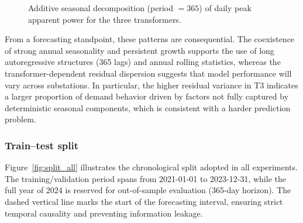 \begin{figure}[!h]
\centering
\begin{subfigure}[t]{\columnwidth}
    \centering
    
\end{subfigure}\par\vspace{0.15cm}
\begin{subfigure}[t]{\columnwidth}
    \centering
    
\end{subfigure}\par\vspace{0.15cm}
\begin{subfigure}[t]{\columnwidth}
    \centering
    
\end{subfigure}
\caption{Additive seasonal decomposition (period $=365$) of daily peak apparent power for the three transformers.}
\label{fig:decomp_all}
\end{figure}

From a forecasting standpoint, these patterns are consequential. The coexistence of strong annual seasonality and persistent growth supports the use of long autoregressive structures (365 lags) and annual rolling statistics, whereas the transformer-dependent residual dispersion suggests that model performance will vary across substations. In particular, the higher residual variance in T3 indicates a larger proportion of demand behavior driven by factors not fully captured by deterministic seasonal components, which is consistent with a harder prediction problem.


\subsubsection{Train--test split}
Figure~\ref{fig:split_all} illustrates the chronological split adopted in all experiments. The training/validation period spans from 2021-01-01 to 2023-12-31, while the full year of 2024 is reserved for out-of-sample evaluation (365-day horizon). The dashed vertical line marks the start of the forecasting interval, ensuring strict temporal causality and preventing information leakage.

